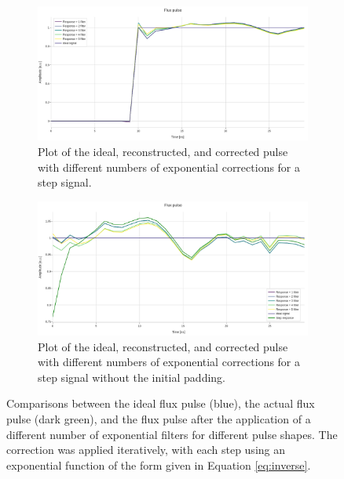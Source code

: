 \begin{figure}[h!]
    \centering
    \begin{subfigure}[t]{0.495\textwidth}
        \includegraphics[width=\textwidth]{figures/png/Cryoscope/filters/step_5_inverse.png}
        \caption{Plot of the ideal, reconstructed, and corrected pulse with different numbers of exponential corrections for a step signal.}
        \label{fig:5inverse:step}
    \end{subfigure}
    \hfill
    \begin{subfigure}[t]{0.495\textwidth}
        \includegraphics[width=\textwidth]{figures/png/Cryoscope/filters/inverse_5_no_pad.png}
        \caption{Plot of the ideal, reconstructed, and corrected pulse with different numbers of exponential corrections for a step signal without the initial padding.}
        \label{fig:5inverse:no_pad}
    \end{subfigure}
    
    \caption{Comparisons between the ideal flux pulse (blue), the actual flux pulse (dark green), and the flux pulse after the application of a different number of exponential filters for different pulse shapes.
    The correction was applied iteratively, with each step using an exponential function of the form given in Equation \eqref{eq:inverse}.}
    \label{fig:5inverse_short}
\end{figure}

